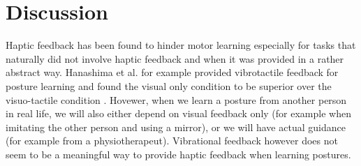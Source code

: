 \pagebreak

\section{Discussion}

Haptic feedback has been found to hinder motor learning especially for tasks that naturally did not involve haptic feedback and when it was provided in a rather abstract way. Hanashima et al. for example provided vibrotactile feedback for posture learning and found the visual only condition to be superior over the visuo-tactile condition \cite{Hanashima2023}. Hovewer, when we learn a posture from another person in real life, we will also either depend on visual feedback only (for example when imitating the other person and using a mirror), or we will have actual guidance (for example from a physiotherapeut). Vibrational feedback however does not seem to be a meaningful way to provide haptic feedback when learning postures.

